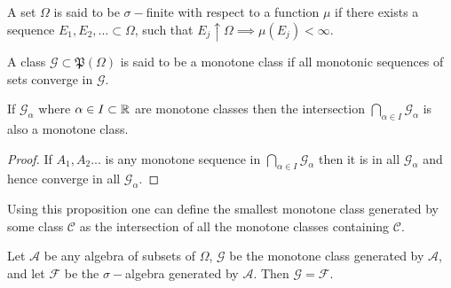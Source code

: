  \begin{definition}
   A set $\Omega$ is said to be $\sigma-$finite with respect to a function $\mu$ if there exists a sequence $E_1,E_2,... \subset \Omega$,  such that $E_j \uparrow \Omega \implies \mu(E_j)<\infty$.
 \end{definition}
 \begin{definition}
   A class $ \mathscr{G} \subset \mathfrak{P} (\Omega)$ is said to be a monotone class if all monotonic sequences of sets converge in $ \mathscr{G}$.
 \end{definition}
 \begin{proposition}
   If $ \mathscr{G}_\alpha$ where $\alpha\in I\subset\mathbb{R}$ are monotone classes then the intersection $\bigcap_{\alpha\in I} \mathscr{G}_\alpha$ is also a monotone class. 
 \end{proposition}
 \begin{proof}
   If $A_1,A_2...$ is any monotone sequence in $\bigcap_{\alpha \in I} \mathscr{G}_\alpha$ then it is in all $ \mathscr{G}_\alpha$ and hence converge in all $ \mathscr{G}_\alpha$.
 \end{proof}
 \begin{remark}
   Using this proposition one can define the smallest monotone class generated by some class $ \mathscr{C}$ as the intersection of all the monotone classes containing $ \mathscr{C}$.
 \end{remark}
 \begin{lemma}\label{lem:damn}
   Let $ \mathscr{A}$ be any algebra of subsets of $\Omega$, $ \mathscr{G}$ be the monotone class generated by $ \mathscr{A}$, and let $ \mathscr{F}$ be the $\sigma-$algebra generated by $ \mathscr{A}$. Then $ \mathscr{G} = \mathscr{F}$.
 \end{lemma}
